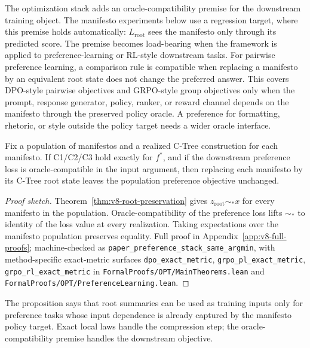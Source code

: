 The optimization stack adds an oracle-compatibility premise for the
downstream training object. The manifesto experiments below use a
regression target, where this premise holds automatically:
\(L_{\mathrm{root}}\) sees the manifesto only through its predicted
score. The premise becomes load-bearing when the framework is applied
to preference-learning or RL-style downstream tasks. For pairwise
preference learning, a comparison rule is compatible when replacing a
manifesto by an equivalent root state does not change the preferred
answer. This covers DPO-style pairwise objectives
\citep{BradleyTerry1952,RafailovEtAl2023DPO} and GRPO-style group
objectives only when the prompt, response generator, policy, ranker,
or reward channel depends on the manifesto through the preserved
policy oracle. A preference for formatting, rhetoric, or style
outside the policy target needs a wider oracle interface.

\begin{proposition}
\label{prop:v8-manifesto-preference-equivalence}
Fix a population of manifestos and a realized C-Tree construction for each
manifesto. If C1/C2/C3 hold exactly for \(f^\ast\), and if the downstream
preference loss is oracle-compatible in the input argument, then replacing each
manifesto by its C-Tree root state leaves the population preference objective
unchanged.
\end{proposition}

\begin{proof}[Proof sketch]
Theorem~\ref{thm:v8-root-preservation} gives
\(z_{\mathrm{root}}\sim_\ast x\) for every manifesto in the
population. Oracle-compatibility of the preference loss lifts
\(\sim_\ast\) to identity of the loss value at every realization.
Taking expectations over the manifesto population preserves
equality. Full proof in Appendix~\ref{app:v8-full-proofs};
machine-checked as
\texttt{paper\_preference\_stack\_same\_argmin}, with method-specific
exact-metric surfaces \texttt{dpo\_exact\_metric},
\texttt{grpo\_pl\_exact\_metric}, \texttt{grpo\_rl\_exact\_metric} in
\texttt{FormalProofs/OPT/MainTheorems.lean} and
\texttt{FormalProofs/OPT/PreferenceLearning.lean}.
\end{proof}

The proposition says that root summaries can be used as training inputs only
for preference tasks whose input dependence is already captured by the
manifesto policy target. Exact local laws handle the compression step; the
oracle-compatibility premise handles the downstream objective.

